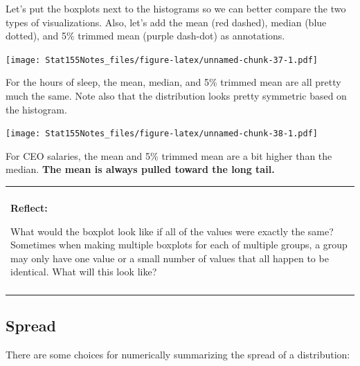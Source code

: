 \documentclass[]{book}
\newenvironment{reflect}
{
    \begin{center}
    
    \begin{tabular}{|p{0.8\textwidth}|}
    \rowcolor{LightBlue}
    \hline\\
    \rowcolor{LightBlue}
    \textbf{Reflect:}
}
{
    \\\rowcolor{LightBlue}
    \\\hline
    \end{tabular} 
    \end{center}
}
\begin{document}
Let's put the boxplots next to the histograms so we can better compare the two types of visualizations. Also, let's add the mean (red dashed), median (blue dotted), and 5\% trimmed mean (purple dash-dot) as annotations.

\texttt{[image: Stat155Notes\_files/figure-latex/unnamed-chunk-37-1.pdf]}

For the hours of sleep, the mean, median, and 5\% trimmed mean are all pretty much the same. Note also that the distribution looks pretty symmetric based on the histogram.

\texttt{[image: Stat155Notes\_files/figure-latex/unnamed-chunk-38-1.pdf]}

For CEO salaries, the mean and 5\% trimmed mean are a bit higher than the median. \textbf{The mean is always pulled toward the long tail.}

\begin{reflect}
What would the boxplot look like if all of the values were exactly the
same? Sometimes when making multiple boxplots for each of multiple
groups, a group may only have one value or a small number of values that
all happen to be identical. What will this look like?
\end{reflect}

\hypertarget{spread}{%
\subsection{Spread}\label{spread}}

There are some choices for numerically summarizing the spread of a distribution:
\end{document}
